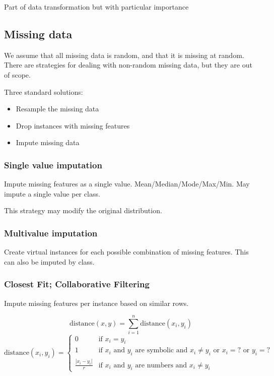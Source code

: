 \documentclass{idc_msc}
\begin{document}
Part of data transformation but with particular importance

\subsection{Missing data}

We assume that all missing data is random, and that it is missing at random.
There are strategies for dealing with non-random missing data, but they are out of scope.

Three standard solutions:

\begin{itemize}
  \item Resample the missing data
  \item Drop instances with missing features
  \item Impute missing data
\end{itemize}

\subsubsection{Single value imputation}

Impute missing features as a single value.
Mean/Median/Mode/Max/Min.
May impute a single value per class.

This strategy may modify the original distribution.

\subsubsection{Multivalue imputation}

Create virtual instances for each possible combination of missing features.
This can also be imputed by class.

\subsubsection{Closest Fit; Collaborative Filtering}

Impute missing features per instance based on similar rows.

\[\text{distance}(x,y)=\sum_{i=1}^{n}\text{distance}(x_i,y_i)\]
\[
  \text{distance}(x_i,y_i)=
  \begin{cases}
    0 & \text{if }x_i = y_i \\
    1 & \text{if $x_i$ and $y_i$ are symbolic and $x_i \ne y_i$ or $x_i=?$ or $y_i=?$} \\
    \frac{|x_i-y_i|}{r} & \text{if $x_i$ and $y_i$ are numbers and $x_i \ne y_i$}
  \end{cases}
\]
\end{document}
